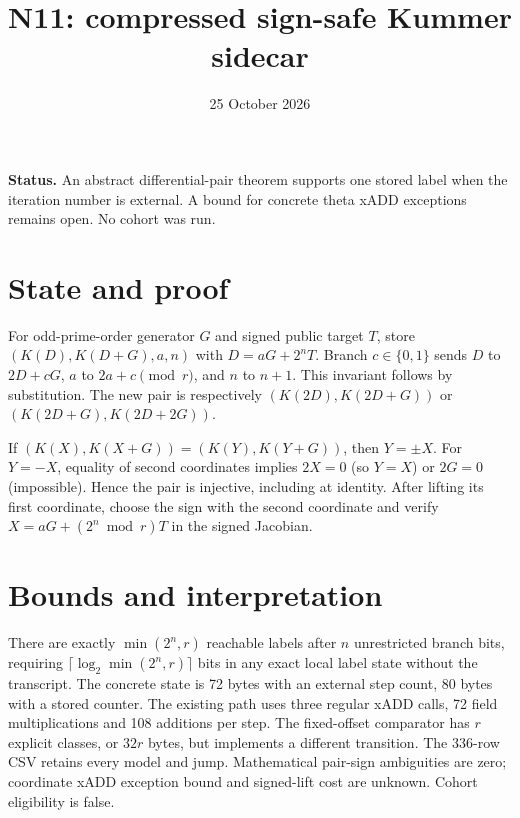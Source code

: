 \documentclass[11pt]{article}
\title{N11: compressed sign-safe Kummer sidecar}
\date{25 October 2026}
\begin{document}
\maketitle
\noindent\textbf{Status.} An abstract differential-pair theorem supports one stored
label when the iteration number is external. A bound for concrete theta xADD
exceptions remains open. No cohort was run.

\section*{State and proof}
For odd-prime-order generator $G$ and signed public target $T$, store
$(K(D),K(D+G),a,n)$ with $D=aG+2^nT$. Branch $c\in\{0,1\}$ sends
$D$ to $2D+cG$, $a$ to $2a+c\pmod r$, and $n$ to $n+1$.
This invariant follows by substitution. The new pair is respectively
$(K(2D),K(2D+G))$ or $(K(2D+G),K(2D+2G))$.

If $(K(X),K(X+G))=(K(Y),K(Y+G))$, then $Y=\pm X$.
For $Y=-X$, equality of second coordinates implies $2X=0$ (so $Y=X$)
or $2G=0$ (impossible). Hence the pair is injective, including at identity.
After lifting its first coordinate, choose the sign with the second coordinate
and verify $X=aG+(2^n\bmod r)T$ in the signed Jacobian.

\section*{Bounds and interpretation}
There are exactly $\min(2^n,r)$ reachable labels after $n$ unrestricted branch
bits, requiring $\lceil\log_2\min(2^n,r)\rceil$ bits in any exact local label
state without the transcript. The concrete state is 72 bytes with an external
step count, 80 bytes with a stored counter. The existing path uses three
regular xADD calls, 72 field multiplications and 108 additions per step.
The fixed-offset comparator has $r$ explicit classes, or $32r$ bytes, but
implements a different transition. The 336-row CSV retains every model and
jump. Mathematical pair-sign ambiguities are zero; coordinate xADD exception
bound and signed-lift cost are unknown. Cohort eligibility is false.
\end{document}
